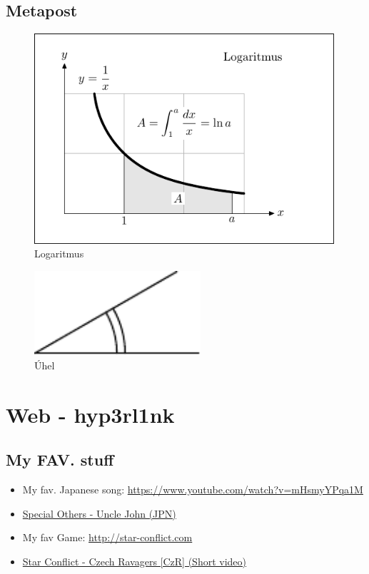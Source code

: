 \documentclass[12pt,a4paper]{article}
\begin{document}
{{	\subsection{Metapost}
	\label{metapost}
	\vspace*{1.5cm}
\begin{figure}[h]
    \centering
    \includegraphics[width=0.99\textwidth]{METAPOST_1-1}
    \caption{Logaritmus}
    \label{fig:graf}
\end{figure}
	\vspace*{1.5cm}
\begin{figure}[h]
    \centering
    \includegraphics[width=0.55\textwidth]{METAPOST_2-49}
    \caption{Úhel}
    \label{fig:graf}
\end{figure}
	\vspace*{1.5cm}
	\newpage
	\section{Web - hyp3rl1nk}
	\subsection{My FAV. stuff}
	\begin{itemize}
		\item My fav. Japanese song: \url{https://www.youtube.com/watch?v=mHsmyYPqa1M}
		\item \href{https://www.youtube.com/watch?v=vMNFU_6hBfI}{Special Others - Uncle John (JPN)}
		\item My fav Game: \url{http://star-conflict.com}
		\item \href{https://www.youtube.com/watch?v=L2t714QggGc}{Star Conflict - Czech Ravagers [CzR] (Short video)}
	\end{itemize}
	\newpage
}}
\end{document}
